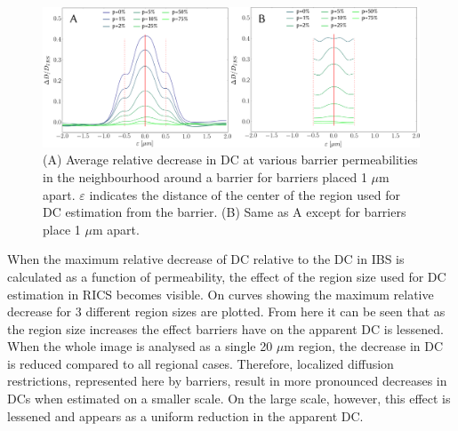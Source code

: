 \begin{figure}%
  \centering
    \includegraphics[width=12cm]{figures/walls_xi.pdf}
    \caption[Average relative decrease in \acs{DC} for barriers 5 and 1 $\mu$m apart]
    {(A) Average relative decrease in \acs{DC} at various barrier
    permeabilities in the neighbourhood around a barrier for barriers
    placed 1 $\mu$m apart.  $\varepsilon$
    indicates the distance of the center of the region used for \ac{DC} estimation
    from the barrier. (B) Same as A except for barriers place 1 $\mu$m
    apart.}
    \label{fig:walls_xi}
\end{figure}
%
When the maximum relative decrease of \ac{DC} relative to the \ac{DC} in
\ac{IBS} is calculated as a function of permeability, the
effect of the region size used for \ac{DC} estimation in \ac{RICS}
becomes visible. On \F{\ref{fig:max_5}} curves showing the maximum relative
decrease for 3 different region sizes are plotted. From here it can be
seen that as the region size increases the effect barriers have on the
apparent \ac{DC} is lessened. When the whole image is analysed as a
single 20 $\mu$m region, the decrease in \ac{DC} is reduced compared to
all regional cases. Therefore, localized diffusion restrictions,
represented here by barriers, result in more pronounced
decreases in \acp{DC} when estimated on a smaller scale. On the large scale,
however, this effect is lessened and appears as a uniform reduction in
the apparent \ac{DC}.

